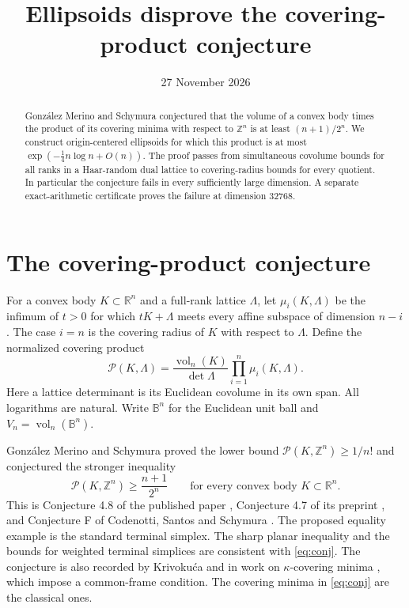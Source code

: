 \documentclass[11pt]{article}
\title{Ellipsoids disprove the covering-product conjecture}
\author{}
\date{27 November 2026}
\newcommand{\B}{\mathbb B}
\newcommand{\R}{\mathbb R}
\newcommand{\Z}{\mathbb Z}
\newcommand{\vol}{\operatorname{vol}}
\newcommand{\Pcov}{\mathcal P}
\begin{document}
\maketitle

\begin{abstract}
Gonz\'alez Merino and Schymura conjectured that the volume of a convex
body times the product of its covering minima with respect to
\(\mathbb Z^n\) is at least \((n+1)/2^n\).
We construct origin-centered ellipsoids for which this product is at most
\(\exp(-\tfrac14 n\log n+O(n))\).
The proof passes from simultaneous covolume bounds for all ranks in
a Haar-random dual lattice to covering-radius bounds for every quotient.
In particular the conjecture fails in every sufficiently large dimension.
A separate exact-arithmetic certificate proves the failure at dimension
\(32768\).
\end{abstract}

\section{The covering-product conjecture}

For a convex body \(K\subset\R^n\) and a full-rank lattice \(\Lambda\),
let \(\mu_i(K,\Lambda)\) be the infimum of \(t>0\) for which
\(tK+\Lambda\) meets every affine subspace of dimension \(n-i\).
The case \(i=n\) is the covering radius of \(K\) with respect to
\(\Lambda\). Define the normalized covering product
\[
 \Pcov(K,\Lambda)=
 \frac{\vol_n(K)}{\det\Lambda}\prod_{i=1}^n\mu_i(K,\Lambda).
\]
Here a lattice determinant is its Euclidean covolume in its own span.
All logarithms are natural. Write \(\B^n\) for the Euclidean unit ball
and \(V_n=\vol_n(\B^n)\).

Gonz\'alez Merino and Schymura proved the lower bound
\(\Pcov(K,\Z^n)\ge1/n!\) and conjectured the stronger inequality
\begin{equation}\label{eq:conj}
 \Pcov(K,\Z^n)\ge\frac{n+1}{2^n}
 \qquad\text{for every convex body }K\subset\R^n.
\end{equation}
This is Conjecture 4.8 of the published paper \cite{GMS},
Conjecture 4.7 of its preprint \cite{GMH}, and Conjecture F of
Codenotti, Santos and Schymura \cite[Sec.~5.2]{CSS}.
The proposed equality example is the standard terminal simplex.
The sharp planar inequality and the bounds for weighted terminal
simplices are consistent with \eqref{eq:conj}. The conjecture
is also recorded by Krivoku\'{c}a \cite{Krivokuca} and in work on \(\kappa\)-covering minima
\cite[Sec.~1]{Xue}, which impose a common-frame condition.
The covering minima in \eqref{eq:conj} are the classical ones.
\end{document}
